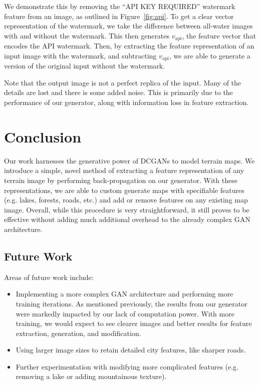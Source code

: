 \documentclass[11pt,twocolumn,letterpaper]{article}
\begin{document}
We demonstrate this by removing the ``API KEY REQUIRED'' watermark feature from an image, as outlined in Figure~\ref{fig:api}. To get a clear vector representation of the watermark, we take the difference between all-water images with and without the watermark. This then generates $v_{\text{api}}$, the feature vector that encodes the API watermark. Then, by extracting the feature representation of an input image with the watermark, and subtracting $v_{\text{api}}$, we are able to generate a version of the original input without the watermark.

Note that the output image is not a perfect replica of the input. Many of the details are lost and there is some added noise. This is primarily due to the performance of our generator, along with information loss in feature extraction.


\section{Conclusion}
Our work harnesses the generative power of DCGANs to model terrain maps. We introduce a simple, novel method of extracting a feature representation of any terrain image by performing back-propagation on our generator. With these representations, we are able to custom generate maps with specifiable features (e.g. lakes, forests, roads, etc.) and add or remove features on any existing map image. Overall, while this procedure is very straightforward, it still proves to be effective without adding much additional overhead to the already complex GAN architecture.

\subsection{Future Work}
Areas of future work include:
\begin{itemize}
\item Implementing a more complex GAN architecture and performing more training iterations. As mentioned previously, the results from our generator were markedly impacted by our lack of computation power. With more training, we would expect to see clearer images and better results for feature extraction, generation, and modification.
\item Using larger image sizes to retain detailed city features, like sharper roads.
\item Further experimentation with modifying more complicated features (e.g. removing a lake or adding mountainous texture).
\end{itemize}
  

{\small


}
\end{document}
